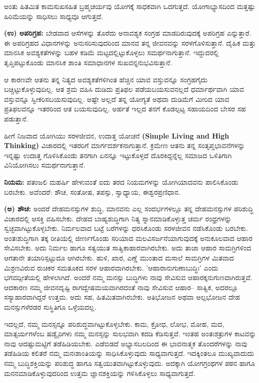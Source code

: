 ಅಂತು ಹಿತಮಿತ ಕಾಮಸುಖಸಹಿತ ಬ್ರಹ್ಮಚರ್ಯವು ಯೋಗಕ್ಕೆ ಸಾಧಕವಾಗಿ ಒದಗುತ್ತದೆ. ಯೋಗಾಭ್ಯಾಸದಿಂದ ಮತ್ತಷ್ಟು ಹಿರಿಮೆಯನ್ನು ಸಾಧಿಸಲು ಸಾಧ್ಯವೂ ಆಗುತ್ತದೆ.

\textbf{(ಉ) ಅಪರಿಗ್ರಹ:} ಬೇಡವಾದ ಆಸೆಗಳನ್ನು ತೊರೆದು ಅನಾವಶ್ಯಕ ಸಂಗ್ರಹ ಮಾಡದಿರುವುದಕ್ಕೆ ಅಪರಿಗ್ರಹ ಎನ್ನುತ್ತಾರೆ. ಈ ಅಪರಿಗ್ರಹದ ವಿಧಾನಗಳನ್ನು ಅನುಸರಿಸುವುದರಿಂದ ಮಾನವ ತನ್ನ ಜೀವನವನ್ನು ಸರಳಗೊಳಿಸುತ್ತಾನೆ. ದೈಹಿಕ ಮತ್ತು ಮಾನಸಿಕ ಅವಶ್ಯಕತೆಗಳನ್ನು ಬಹಳ ಕಡಿಮೆ ಮಟ್ಟದಲ್ಲಿಟ್ಟುಕೊಳ್ಳಲು ಸಮರ್ಥನಾಗುತ್ತಾನೆ. ಇದ್ದುದರಲ್ಲಿ ತೃಪ್ತಿಪಟ್ಟುಕೊಂಡು ಮಾನಸಿಕ ಶಾಂತಿ ಸಮಾಧಾನಗಳ ಸುಖವನ್ನನುಭವಿಸುತ್ತಾನೆ.

ಆ ಕಾರಣವೇ ಆತನು ತನ್ನ ನಿತ್ಯದ ಅವಶ್ಯಕತೆಗಳಿಗಿಂತ ಹೆಚ್ಚಿನ ಯಾವ ವಸ್ತುವನ್ನೂ ಸಂಗ್ರಹಗೈದು ಬಚ್ಚಿಟ್ಟುಕೊಳ್ಳುವುದಿಲ್ಲ. ಆತ ಶ್ರಮ ವಹಿಸಿ ದುಡಿದು ಪ್ರತಿಫಲ ಪಡೆಯಬಯಸುವನಲ್ಲದೆ ಧರ್ಮಾರ್ಥವಾಗಿ ಯಾವ ವಸ್ತುವನ್ನೂ ಸ್ವೀಕರಿಸಬಯಸುವುದಿಲ್ಲ. ಅಷ್ಟೇ ಅಲ್ಲದೆ ತನ್ನ ಯೋಗ್ಯತೆ ಅಥವಾ ದುಡಿಮೆಗೆ ಮೀರಿದ ಯಾವ ಪ್ರತಿಫಲವನ್ನೂ ಇತರರಿಂದ ಆತ ಬಯಸುವುದಿಲ್ಲ. ಅರ್ಹತೆ ಇಲ್ಲದ ತನಗೆ ಕೊಡಲ್ಪಟ್ಟ ಸಹಾಯದಿಂದ ಬೇಸರ ಸಹ ಪಡುತ್ತಾನೆ.

ಹೀಗೆ ನಿಜವಾದ ಯೋಗಿಯು ಸರಳಜೀವನ, ಉದಾತ್ತ ಯೋಚನೆ \textbf{(Simple Living and High Thinking)} ವಿಚಾರದಲ್ಲಿ ಇತರರಿಗೆ ಮಾರ್ಗದರ್ಶಕನಾಗುತ್ತಾನೆ. ಕ್ರಮೇಣ ಆತನು ತನ್ನ ಸಂತೃಪ್ತಭಾವನೆಗಳನ್ನು ಇನ್ನಷ್ಟು ಉದಾತ್ತ ಗೊಳಿಸಿಕೊಂಡು ತನಗಾಗಿ ಏನನ್ನೂ ಇಟ್ಟುಕೊಳ್ಳದೆ ದೊರಕಿದ್ದನ್ನೆಲ್ಲ ಸಮಾಜದ ಒಳಿತಿಗಾಗಿ ವಿನಿಯೋಗಿಸಲು ಸಮರ್ಥನಾಗುತ್ತಾನೆ.

\textbf{  ನಿಯಮ:} ಪತಂಜಲಿ ಮಹರ್ಷಿ ಹೇಳುವಂತೆ ಐದು ತರದ ನಿಯಮಗಳನ್ನು ಯೋಗಿಯಾದವನು ಪಾಲಿಸಿಕೊಂಡು ಬರಬೇಕು. ಅವೆಂದರೆ: ಶೌಚ, ಸಂತೋಷ, ತಪಸ್ಸು, ಸ್ವಾಧ್ಯಾಯ, ಈಶ್ವರಪ್ರಣಿಧಾನ.

\textbf{(ಅ) ಶೌಚ:} ಅಂದರೆ ದೇಹಮನಸ್ಸುಗಳ ಶುದ್ಧಿ, ಮಾನವನು ಎಲ್ಲ ಸಂದರ್ಭಗಳಲ್ಲೂ ತನ್ನ ದೇಹಮನಸ್ಸುಗಳ ಪರಿಶುದ್ಧಿ ವಿಚಾರದಲ್ಲಿ ಆಸಕ್ತಿ ವಹಿಸಬೇಕು. ದೇಹದ ಬಾಹ್ಯಶುದ್ಧಿಗಾಗಿ ನಿತ್ಯ ಸ್ನಾನಮಾಡಿಕೊಳ್ಳುತ್ತ ಚರ್ಮ ರಂಧ್ರಗಳನ್ನು ಸ್ವಚ್ಛವಾಗಿಟ್ಟುಕೊಳ್ಳಬೇಕು. ನಿರ್ಮಲವಾದ ಬಟ್ಟೆ ಬರೆಗಳನ್ನು ಧರಸಿಕೊಂಡು ಸರಳಜೀವನ ನಡೆಸಿಕೊಂಡು ಬರಬೇಕು. ಅಂತಃಶುದ್ಧಿಗಾಗಿ ತಕ್ಕ ರೀತಿಯಲ್ಲಿ ಜೀರ್ಣಗೊಂಡು ಸರಿಯಾದ ಮಲವಿಸರ್ಜನೆಯಾಗುವುದಕ್ಕೆ ಅನುಕೂಲವಾದ ಆಹಾರ ಸೇವಿಸಬೇಕು. ಅದು ನಿರ್ಮಲ ಹಾಗೂ ಸತ್ವಯುತ ಸಾತ್ವಿಕಾಹಾರವಾಗಿರಬೇಕು. ಅದು ತಾಜಾ ಆಹಾರ ಸಾಮಗ್ರಿಗಳಿಂದ ಆಗತಾನೇ ತಯಾರಿಸ್ಪಟ್ಟುದೂ ಆಗಿರಬೇಕು. ಹುಳಿ, ಖಾರ, ಎಣ್ಣೆ ಮುಂತಾದ ಮಸಾಲೆ ಸಾಮಗ್ರಿಗಳ ಮಿತವಾದ ಮಿಶ್ರಣವಿರುವ ರುಚಿಕರ ಸಮತೂಕದ ಸರಳ ಆಹಾರವಾಗಿರಬೇಕು. 'ಆಹಾರಾನುಗುಣಾಬುದ್ಧಿಃ' ಎಂದು ಭಗವದ್ಗೀತೆಯಲ್ಲಿ ಹೇಳಲಾಗಿದೆ. ಅಂದರೆ ನಮ್ಮ ಮನಸ್ಸು ಬುದ್ಧಿಗಳು ನಾವು ಸೇವಿಸುವ ಆಹಾರಕ್ಕನುಗುಣವಾಗಿರುತ್ತವೆ. ಆದಕಾರಣ ನಮ್ಮ ಜೀವನದೃಷ್ಟಿ ರಾಗದ್ವೇಷಮಯವಾಗಿರದಂತೆ ನಾವು ಸೇವಿಸುವ ಆಹಾರ– ಸಾತ್ವಿಕ, ಅದರಲ್ಲೂ ಸಸ್ಯಾಹಾರವಾಗಿದ್ದರೆ ಉತ್ತಮ. ಅದು ಸಹ, ಹಿತಮಿತವಾಗಿರಬೇಕು. ಅತಿಭೋಜನ ಅಥವಾ ಅಲ್ಪಭೋಜನ ದೇಹ ಮನಸ್ಸುಗಳೆರಡರ ಸುಸ್ಥಿತಿಗೂ ಒಳ್ಳೆಯದಲ್ಲ.

ಇದಲ್ಲದೆ, ನಮ್ಮ ಮನಸ್ಸನ್ನೂ ಪರಿಶುದ್ಧವಾಗಿಟ್ಟುಕೊಳ್ಳಬೇಕು. ಕಾಮ, ಕ್ರೋಧ, ಲೋಭ, ಮೋಹ, ಮದ, ಮಾತ್ಸರ್ಯಗಳೆಂಬ ಷಡ್ವೈರಿಗಳು ನಮ್ಮ ಮನಸ್ಸನ್ನು ಸುಲಭವಾಗಿ ಕದಡಿ ಕೆಡಿಸುತ್ತವೆ. ಇಂತಹ ಅಂತಃಶತ್ರುಗಳ ಕಾಟವನ್ನು ನಾವು ಆದಷ್ಟುಮಟ್ಟಿಗೆ ತಡೆಹಿಡಿಯಬೇಕು. ಎಡೆಬಿಡದೆ ಅಭ್ಯಾಸಬಲದಿಂದ ಈ ಭಾವನಾತ್ಮಕ ತೊಂದರೆಗಳನ್ನು ನಾವು ತಡೆಹಿಡಿಯ ಕಲಿತರೆ ನಮ್ಮ ಮನಃಶಾಂತಿಯನ್ನು ಸಾಧಿಸಿಕೊಳ್ಳುವುದು ಸಾಧ್ಯವಾಗುತ್ತದೆ. ಇದಕ್ಕಿಂತಲೂ ಮುಖ್ಯವಾದುದು ನಮ್ಮ ಬುದ್ಧಿಶಕ್ತಿಯನ್ನು ಪರಿಶುದ್ಧ ಹಾಗೂ ಸತ್ವಯುತವಾಗಿಟ್ಟುಕೊಳ್ಳುವುದು. ಅದಕ್ಕಾಗಿ ಯೋಗಗ್ರಂಥಗಳ ಪಠನ ಹಾಗೂ ಮನನಮಾಡಿಕೊಳ್ಳುವುದರಿಂದ ಉತ್ತಮ ಜ್ಞಾನಶಕ್ತಿಯನ್ನು ಗಳಿಸಿಕೊಳ್ಳಲು ಸಾಧ್ಯವಾಗುತ್ತದೆ.

